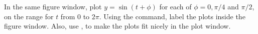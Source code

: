 {In the same figure window, plot $y=\sin(t+\phi)$ for each of $\phi = 0, \pi/4$ and  $\pi/2$, on the range for $t$ from $0$ to $2\pi$.  Using the  command, label the plots inside the figure window.  Also, use ,  to make the plots fit nicely in the plot window.}
{}